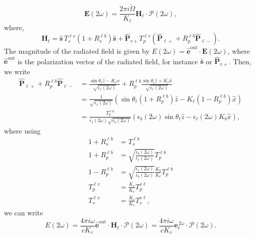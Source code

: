 \documentclass[10pt]{article}
\begin{document}
\begin{equation}\label{r8}
\mathbf{E}(2\omega) = \frac{2\pi i\tilde{\Omega}}{K_{\ell}}
\mathbf{H}_{\ell}\cdot\boldsymbol{\mathcal{P}}(2\omega),
\end{equation}
where,
\begin{equation}\label{r9}
\mathbf{H}_{\ell}
= \hat{\mathbf{s}}\,T_s^{\ell v}\left(1+R_s^{\ell b}\right)\hat{\mathbf{s}}
+ \hat{\mathbf{P}}_{v+}T_{p}^{\ell v}
\left(
\hat{\mathbf{P}}_{\ell +} +R_{p}^{\ell b}\hat{\mathbf{P}}_{\ell -}
\right). 
\end{equation}
The magnitude of the radiated field is given by
$E(2\omega)=\hat{\mathbf{e}}^{\mathrm{out}}\cdot\mathbf{E}(2\omega)$, where
$\hat{\mathbf{e}}^{\mathrm{out}}$ is the polarization vector of the radiated
field, for instance $\hat{\mathbf{s}}$ or $\hat{\mathbf{P}}_{v+}$. Then, we
write
\begin{align}\label{m1}
\hat{\mathbf{P}}_{\ell +} + R_{p}^{\ell b}\hat{\mathbf{P}}_{\ell -}
&= \frac{\sin\theta_{\ell}\hat{z} - K_{\ell}\hat{x}}
        {\sqrt{\epsilon_{\ell}(2\omega)}}
 + R_{p}^{\ell b}
   \frac{\sin\theta_{\ell}\hat{z} + K_{\ell}\hat{x}}
        {\sqrt{\epsilon_{\ell}(2\omega)}}
\\\nonumber
&= \frac{1}{\sqrt{\epsilon_{\ell}(2\omega)}}
\left(
\sin\theta_{\ell}(1+R^{\ell b}_{p})\hat{z} - K_{\ell}(1-R^{\ell b}_{p})\hat{x} 
\right)
\\\nonumber 
&= \frac{T^{\ell b}_{p}}{\epsilon_{\ell}(2\omega)\sqrt{\epsilon_{b}(2\omega)}}
\left(
  \epsilon_{b}(2\omega)\sin\theta_{\ell}\hat{z} 
- \epsilon_{\ell}(2\omega)K_{b}\hat{x}
\right)
,
\end{align}
where using
\begin{align}
1 + R^{\ell b}_{s} &= T^{\ell b}_{s}\nonumber\\
1 + R^{\ell b}_{p}
&= \sqrt{\frac{\epsilon_{b}(2\omega)}{\epsilon_{\ell}(2\omega)}}T^{\ell b}_{p} 
\nonumber\\
1 - R^{\ell b}_{p}
&= \sqrt{\frac{\epsilon_{\ell}(2\omega)}{\epsilon_{b}(2\omega)}}
   \frac{K_{b}}{K_{\ell}}T^{\ell b}_{p}\nonumber\\
T^{\ell v}_{p} &= \frac{K_{\ell}}{K_{v}}T^{v\ell}_{p}\nonumber\\
T^{\ell v}_{s} &= \frac{K_{\ell}}{K_{v}}T^{v\ell}_{s}
,
\end{align}
we can write
\begin{equation}\label{r10}
E(2\omega) = \frac{4\pi i \omega}{cK_{v}}
\hat{\mathbf{e}}^{\mathrm{out}}\cdot
\mathbf{H}_{\ell}\cdot
\boldsymbol{\mathcal{P}}(2\omega) 
= \frac{4\pi i\omega}{cK_{v}}
  \mathbf{e}^{\,2\omega}_{\ell}\cdot\boldsymbol{\mathcal{P}}(2\omega). 
\end{equation}
\end{document}
